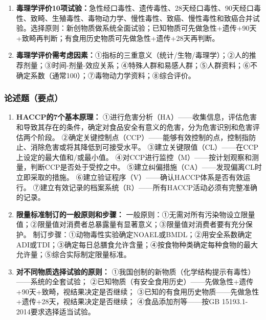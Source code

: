 {\begin{enumerate}[leftmargin=*, itemsep=6pt]
    \item \textbf{毒理学评价10项试验：}急性经口毒性、遗传毒性、28天经口毒性、90天经口毒性、致畸、生殖毒性、毒物动力学、慢性毒性、致癌、慢性毒性和致癌合并试验。选择原则：新创物质做系统全面试验；已知物质可先做急性+遗传+90天+致畸再判断；有食用历史物质可先做急性+遗传+28天再判断。
    \item \textbf{毒理学评价需考虑因素：}①指标的三重意义（统计/生物/毒理学）；②人的推荐剂量；③时间-剂量-效应关系；④特殊人群和易感人群；⑤人群资料；⑥不确定系数（通常100）；⑦毒物动力学资料；⑧综合评价。
\end{enumerate}

\subsubsection*{论述题（要点）}

\begin{enumerate}[leftmargin=*, itemsep=6pt]
    \item \textbf{HACCP的7个基本原理：}
    ①进行危害分析（HA）——收集信息，评估危害和导致其存在的条件，确定对食品安全有意义的危害，分为危害识别和危害评估两个阶段。
    ②确定关键控制点（CCP）——能够有效控制的点，控制指防止、消除危害或将其降低到可接受水平。
    ③建立关键限值（CL）——在CCP上设定的最大值和/或最小值。
    ④对CCP进行监控（M）——按计划观察和测量，判断CCP是否处于受控之中。
    ⑤建立纠偏措施（CA）——发现偏离CL时立即采取的措施。
    ⑥建立验证程序（V）——确认HACCP体系是否有效运行。
    ⑦建立有效记录的档案系统（R）——所有HACCP活动必须有完整准确的记录。

    \item \textbf{限量标准制订的一般原则和步骤：}
    一般原则：①无需对所有污染物设立限量值；②限量值对消费者总暴露量有显著意义；③限量值对消费者要有充分保护。
    制订步骤：①动物毒性实验确定NOAEL或BMDL；②用安全系数确定ADI或TDI；③确定每日总膳食允许含量；④按食物种类确定每种食物的最大允许量；⑤综合实际制定限量标准。

    \item \textbf{对不同物质选择试验的原则：}
    ①我国创制的新物质（化学结构提示有毒性）——系统的全套试验；
    ②已知物质（有安全食用历史）——先做急性+遗传+90天+致畸，视结果决定是否继续；
    ③已知的有食用历史物质——先做急性+遗传+28天，视结果决定是否继续；
    ④食品添加剂等——按GB 15193.1-2014要求选择适当试验。
\end{enumerate}

\newpage
}
